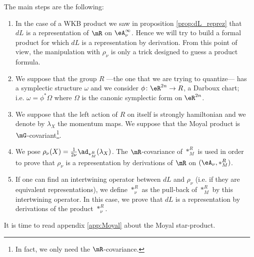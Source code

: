 The main steps are the following:
{\renewcommand{\theenumi}{\arabic{enumi}.}
\begin{enumerate}
\item In the case of a WKB product we saw in proposition \ref{prop:dL_reprez} that $dL$ is a representation of $\mR$ on $\eA_{\nu}^{\infty}$. Hence we will try to build a formal product for which $dL$ is a representation by derivation. From this point of view, the manipulation with $\rho_{\nu}$ is only a trick designed to guess a product formula.

\item We suppose that the group $R$ ---the one that we are trying to quantize--- has a symplectic structure $\omega$ and we consider $\phi\colon \eR^{2n}\to R$, a Darboux chart; i.e. $\omega=\phi^*\Omega$ where $\Omega$ is the canonic symplectic form on $\eR^{2n}$.

\item We suppose that the left action of $R$ on itself is strongly hamiltonian and we denote by $\lambda_X$ the momentum maps. We suppose that the Moyal product is $\mG$-covariant\footnote{In fact, we only need the $\mR$-covariance.}.

\item We pose $\rho_{\nu}(X)=\frac{1}{ 2\nu }\ad_{\ast_M^R}(\lambda_X)$. The $\mR$-covariance of $\ast_M^R$ is used in order to prove that $\rho_{\nu}$ is a  representation by derivations of $\mR$ on $(\eA_{\nu},\ast_M^R)$. 
\item If one can find an intertwining operator between $dL$ and $\rho_{\nu}$ (i.e. if they are equivalent representations), we define $\ast_{\nu}^R$ as the pull-back of $\ast_M^R$ by this intertwining operator. In this case, we prove that $dL$ is a representation by derivations of the product $\ast_{\nu}^R$.
\end{enumerate}

}       %
    It is time to read appendix \ref{app:Moyal} about the Moyal star-product.

